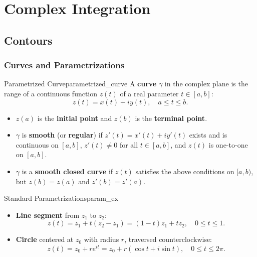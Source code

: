 \chapter{Complex Integration}

\section{Contours}

\subsection{Curves and Parametrizations}

\begin{definition}{Parametrized Curve}{parametrized_curve}
A \textbf{curve} $\gamma$ in the complex plane is the range of a continuous function $z(t)$ of a real parameter $t \in [a, b]$:
\begin{equation}
z(t) = x(t) + i y(t), \quad a \le t \le b.
\end{equation}
\begin{itemize}
    \item $z(a)$ is the \textbf{initial point} and $z(b)$ is the \textbf{terminal point}.
    \item $\gamma$ is \textbf{smooth} (or \textbf{regular}) if $z'(t) = x'(t) + i y'(t)$ exists and is continuous on $[a, b]$, $z'(t) \neq 0$ for all $t \in [a, b]$, and $z(t)$ is one-to-one on $[a, b]$.
    \item $\gamma$ is a \textbf{smooth closed curve} if $z(t)$ satisfies the above conditions on $[a, b)$, but $z(b) = z(a)$ and $z'(b) = z'(a)$.
\end{itemize}
\end{definition}

\begin{example}{Standard Parametrizations}{param_ex}
\begin{itemize}
    \item \textbf{Line segment} from $z_1$ to $z_2$:
    \begin{equation}
    z(t) = z_1 + t(z_2 - z_1) = (1 - t)z_1 + t z_2, \quad 0 \le t \le 1.
    \end{equation}
    \item \textbf{Circle} centered at $z_0$ with radius $r$, traversed counterclockwise:
    \begin{equation}
    z(t) = z_0 + r e^{it} = z_0 + r(\cos t + i \sin t), \quad 0 \le t \le 2\pi.
    \end{equation}
\end{itemize}
\end{example}

